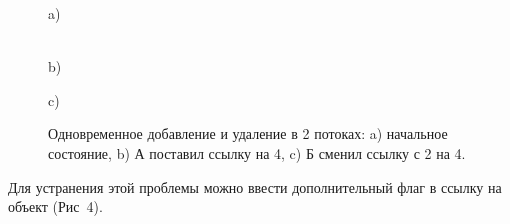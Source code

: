 \documentclass[12pt]{article}
\begin{document}
{				\begin{figure}[h]
					\begin{minipage}[h]{0.45\linewidth}
						 a) \\
					\end{minipage}
					\hfill
					\begin{minipage}[h]{0.45\linewidth}
						 \\b)
					\end{minipage}
					\vfill
					\begin{minipage}[h]{0.45\linewidth}
						 c) \\
					\end{minipage}
					\caption{Одновременное добавление и удаление в 2 потоках: a) начальное состояние, b) А поставил ссылку на 4, c) Б сменил ссылку с 2 на 4.}
				\end{figure}
				\par Для устранения этой проблемы можно ввести дополнительный флаг в ссылку на объект (Рис~4).
				\begin{figure}[h]
					\begin{lstlisting}

\end{lstlisting}
\end{figure}}
\end{document}
